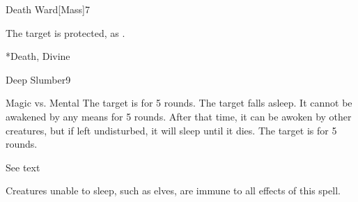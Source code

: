 \begin{spellsection}{Death Ward}[Mass]{7}
    \begin{spellheader}
    \end{spellheader}
    \begin{spellcontent}
        \begin{spelltargetinginfo}
        \end{spelltargetinginfo}
        \begin{spelleffects}
            \spelleffect The target is protected, as .
            \spelldur \durshort
        \end{spelleffects}
    \end{spellcontent}
    \begin{spellfooter}
        *{Death, Divine}
        \miscastexplode
    \end{spellfooter}
\end{spellsection}

\begin{spellsection}{Deep Slumber}{9}
    \begin{spellheader}
    \end{spellheader}
    \begin{spellcontent}
        \begin{spelltargetinginfo}
        \end{spelltargetinginfo}
        \begin{spelleffects}
            \begin{spellattack}{Magic vs. Mental}
                \spellsuccess The target is \blinded for 5 rounds.
                \spellcritical The target falls asleep. It cannot be awakened by any means for 5 rounds. After that time, it can be awoken by other creatures, but if left undisturbed, it will sleep until it dies.
                \spellfailure The target is \dazed for 5 rounds.
            \end{spellattack}
            \spelldur See text
        \end{spelleffects}
    \end{spellcontent}
    \begin{spellfooter}
        \spellnotes Creatures unable to sleep, such as elves, are immune to all effects of this spell.
        \miscastrandom
    \end{spellfooter}
\end{spellsection}

